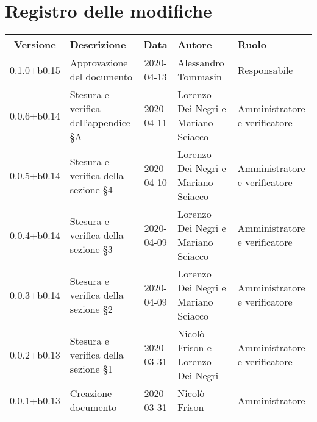 \section*{Registro delle modifiche}

\begin{center}
	\begin{longtable}{|c|p{3.5cm}|c|p{3cm}|p{3cm}|}
	\hline
	\rowcolor{lighter-grayer}
	\textbf{Versione} & \textbf{Descrizione} & \textbf{Data} & \textbf{Autore} & \textbf{Ruolo} \\
	\hline
	\endfirsthead
	
	
	0.1.0+b0.15 & Approvazione del documento & 2020-04-13 & Alessandro Tommasin & Responsabile \\
	\hline
	0.0.6+b0.14 & Stesura e verifica dell'appendice \S A & 2020-04-11 & Lorenzo Dei Negri e Mariano Sciacco & Amministratore e verificatore \\
	\hline
	0.0.5+b0.14 & Stesura e verifica della sezione \S4 & 2020-04-10 & Lorenzo Dei Negri e Mariano Sciacco & Amministratore e verificatore \\
	\hline
	0.0.4+b0.14 & Stesura e verifica della sezione \S3 & 2020-04-09 & Lorenzo Dei Negri e Mariano Sciacco & Amministratore e verificatore \\
	\hline
	0.0.3+b0.14 & Stesura e verifica della sezione \S2 & 2020-04-09 & Lorenzo Dei Negri e Mariano Sciacco & Amministratore e verificatore \\
	\hline
	0.0.2+b0.13 & Stesura e verifica della sezione \S1 & 2020-03-31 & Nicolò Frison e Lorenzo Dei Negri & Amministratore e verificatore \\
	\hline
	0.0.1+b0.13 & Creazione documento & 2020-03-31 & Nicolò Frison & Amministratore \\
	\hline
	\end{longtable}
\end{center}